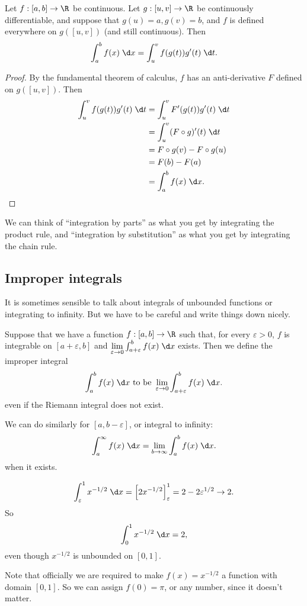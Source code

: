 \documentclass[a4paper]{article}
\begin{document}
\begin{thm}
  Let $f: [a, b] \to \R$ be continuous. Let $g: [u, v] \to \R$ be continuously differentiable, and suppose that $g(u) = a, g(v) = b$, and $f$ is defined everywhere on $g([u, v])$ (and still continuous). Then
  \[
    \int_a^b f(x)\;\d x = \int_u^v f(g(t))g'(t)\;\d t.
  \]
\end{thm}

\begin{proof}
  By the fundamental theorem of calculus, $f$ has an anti-derivative $F$ defined on $g([u, v])$. Then
  \begin{align*}
    \int_u^v f(g(t))g'(t) \;\d t &= \int_u^v F'(g(t))g'(t)\;\d t \\
    &= \int_u^v (F\circ g)'(t)\;\d t \\
    &= F\circ g(v) - F\circ g(u)\\
    &= F(b) - F(a)\\
    &= \int_a^b f(x)\;\d x.\qedhere
  \end{align*}
\end{proof}
We can think of ``integration by parts'' as what you get by integrating the product rule, and ``integration by substitution'' as what you get by integrating the chain rule.

\subsection{Improper integrals}
It is sometimes sensible to talk about integrals of unbounded functions or integrating to infinity. But we have to be careful and write things down nicely.

\begin{defi}
  Suppose that we have a function $f: [a, b] \to \R$ such that, for every $\varepsilon > 0$, $f$ is integrable on $[a + \varepsilon, b]$ and $\lim\limits_{\varepsilon \to 0}\int_{a + \varepsilon}^b f(x)\;\d x$ exists. Then we define the improper integral
  \[
    \int_a^bf(x)\;\d x \text{ to be } \lim_{\varepsilon \to 0}\int_{a + \varepsilon}^b f(x)\;\d x.
  \]
  even if the Riemann integral does not exist.

  We can do similarly for $[a, b - \varepsilon]$, or integral to infinity:
  \[
    \int_a^\infty f(x)\;\d x = \lim_{b \to \infty} \int_a^b f(x)\;\d x.
  \]
  when it exists.
\end{defi}
\begin{eg}
  \[
    \int_\varepsilon^1 x^{-1/2}\;\d x = \left[2x^{-1/2}\right]^1_\varepsilon = 2 - 2\varepsilon^{1/2} \to 2.
  \]
  So
  \[
    \int_0^1 x^{-1/2}\;\d x = 2,
  \]
  even though $x^{-1/2}$ is unbounded on $[0, 1]$.

  Note that officially we are required to make $f(x) = x^{-1/2}$ a function with domain $[0, 1]$. So we can assign $f(0) = \pi$, or any number, since it doesn't matter.
\end{eg}
\end{document}
